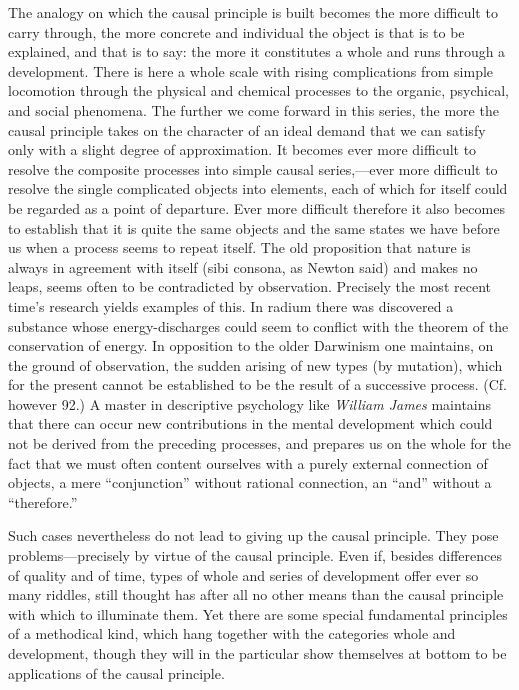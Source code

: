 \documentclass[12pt,a4paper]{book}
\newcommand{\opage}[1]{\marginnote{\footnotesize\textit{[#1]}}}
\begin{document}
The analogy on which the causal principle is built becomes the more difficult to
carry through, the more concrete and individual the object is that is to be
explained, and that is to say: the more it constitutes a whole and runs through a
\opage{288}development. There is here a whole scale with rising complications from simple
locomotion through the physical and chemical processes to the organic, psychical,
and social phenomena. The further we come forward in this series, the more the
causal principle takes on the character of an ideal demand that we can satisfy
only with a slight degree of approximation. It becomes ever more difficult to
resolve the composite processes into simple causal series,---ever more difficult
to resolve the single complicated objects into elements, each of which for itself
could be regarded as a point of departure. Ever more difficult therefore it also
becomes to establish that it is quite the same objects and the same states we have
before us when a process seems to repeat itself. The old proposition that nature
is always in agreement with itself (sibi consona, as Newton said) and makes no
leaps, seems often to be contradicted by observation. Precisely the most recent
time's research yields examples of this. In radium there was discovered a
substance whose energy-discharges could seem to conflict with the theorem of the
conservation of energy. In opposition to the older Darwinism one maintains, on
the ground of observation, the sudden arising of new types (by mutation), which
for the present cannot be established to be the result of a successive process.
(Cf. however 92.) A master in descriptive psychology like \emph{William James}
maintains that there can occur new contributions in the mental development which
could not be derived from the preceding processes, and prepares us on the whole
for the fact that we must often content ourselves with a purely external
connection of objects, a mere ``conjunction'' without rational connection, an
``and'' without a ``therefore.''

Such cases nevertheless do not lead to giving up the causal principle. They pose
problems---precisely by virtue of the causal principle. Even if, besides
differences of quality and of time, types of whole and series of development offer
ever so many riddles, still thought has after all no other means than the causal
principle with which to illuminate them. Yet there are some special fundamental
principles of a methodical kind, which hang together with the categories whole and
development, though they will in the \opage{289}particular show themselves at bottom to be
applications of the causal principle.
\end{document}

